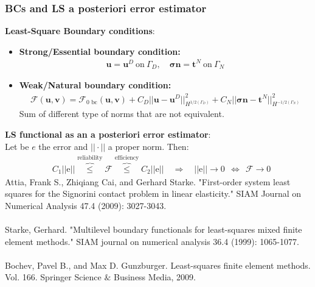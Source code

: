 \documentclass[8pt, oneside]{beamer}   	%
\newcommand{\bn}{\textbf{n}}
\newcommand{\bt}{\textbf{t}}
\newcommand{\bv}{\textbf{v}}
\newcommand{\bu}{\textbf{u}}
\newcommand{\bsigma}{\boldsymbol{\sigma}}
\begin{document}
\begin{frame}
\frametitle{\textbf{BCs and LS a posteriori error estimator}}
\textbf{Least-Square Boundary conditions}:\\
\begin{itemize}
\item \textbf{ Strong/Essential boundary condition:} 
\begin{align*}
\bu=\bu^D \:\text{on}\:\Gamma_D, \quad  \bsigma \bn =\bt^N   \:\text{on}\:\Gamma_N
\end{align*}
\item \textbf{ Weak/Natural boundary condition:}
\begin{align*}
\mathcal{F}(\bu,\bv)=\mathcal{F}_{\text{0 bc}}(\bu,\bv)+C_D ||\bu-\bu^D ||_{H^{1/2(\Gamma_D)}}^2+C_N ||\bsigma \bn - \bt^N  ||_{H^{-1/2(\Gamma_N)}}^2
\end{align*}
Sum of different type of norms that are not equivalent.
\end{itemize}
\textbf{LS functional as an a posteriori error estimator}:\\
Let be $e$ the error and $|| \cdot||$ a proper norm. Then:
\begin{align*}
&C_1 ||\text{e}||  \overbrace{\leq}^{ \text{reliability} }  \mathcal{F} \overbrace{\leq}^{\text{efficiency}} C_2 ||\text{e}||  \quad \Rightarrow \quad
 ||\text{e}||   \to 0 \:\: \iff \:\: \mathcal{F} \to 0
\end{align*}
\footnotesize{Attia, Frank S., Zhiqiang Cai, and Gerhard Starke. "First-order system least squares for the Signorini contact problem in linear elasticity." SIAM Journal on Numerical Analysis 47.4 (2009): 3027-3043.}\\
${}$\\
\footnotesize{Starke, Gerhard. "Multilevel boundary functionals for least-squares mixed finite element methods." SIAM journal on numerical analysis 36.4 (1999): 1065-1077.}\\
${}$\\
\footnotesize{Bochev, Pavel B., and Max D. Gunzburger. Least-squares finite element methods. Vol. 166. Springer Science $\&$ Business Media, 2009.}
\end{frame}
\end{document}
